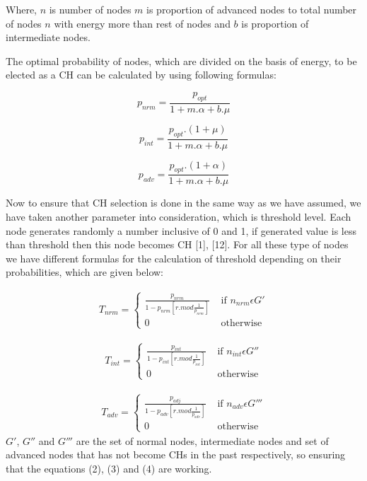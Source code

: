 \documentclass[conference]{IEEEtran}
\begin{document}
Where, $n$ is number of nodes $m$ is proportion of advanced nodes to total number of nodes $n$ with energy more than rest of nodes and $b$ is proportion of intermediate nodes.

The optimal probability of nodes, which are divided on the basis of energy, to be elected as a CH can be calculated by using following formulas:

\begin{equation}
p_{nrm}=\frac{p_{opt}}{1+m.\alpha+b.\mu}
\end{equation}

\begin{equation}
p_{int}=\frac{p_{opt}.(1+\mu)}{1+m.\alpha+b.\mu}
\end{equation}

\begin{equation}
p_{adv}=\frac{p_{opt}.(1+\alpha)}{1+m.\alpha+b.\mu}
\end{equation}

Now to ensure that CH selection is done in the same way as we have assumed, we have taken another parameter into consideration, which is threshold level. Each node generates randomly a number inclusive of 0 and 1, if generated value is less than threshold then this node becomes CH [1], [12]. For all these type of nodes we have different formulas for the calculation of threshold depending on their probabilities, which are given below:

\begin{eqnarray}
T_{nrm} = \left\{ \begin{array}{rl}
 \frac{p_{nrm}}{1-p_{nrm}[r. mod \frac{1}{p_{nrm}}]} &\mbox{ if $n_{nrm} \epsilon  G'$} \\
  0 &\mbox{ otherwise}
       \end{array} \right.
\end{eqnarray}

\begin{eqnarray}
T_{int} = \left\{ \begin{array}{rl}
 \frac{p_{int}}{1-p_{int}[r. mod \frac{1}{p_{int}}]} &\mbox{ if $n_{int} \epsilon  G''$} \\
  0 &\mbox{ otherwise}
       \end{array} \right.
\end{eqnarray}

\begin{eqnarray}
T_{adv} = \left\{ \begin{array}{rl}
 \frac{p_{adj}}{1-p_{adv}[r. mod \frac{1}{p_{adv}}]} &\mbox{ if $n_{adv} \epsilon  G'''$} \\
  0 &\mbox{ otherwise}
       \end{array} \right.
\end{eqnarray}
$G'$, $G''$ and $G'''$ are the set of normal nodes, intermediate nodes and set of advanced nodes that has not become CHs in the past respectively, so ensuring that the equations (2), (3) and (4) are working.\\
\end{document}
